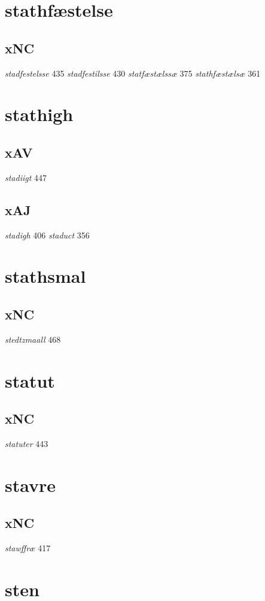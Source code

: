 \documentclass[a4paper,twocolumn]{article}
\begin{document}
\section{stathfæstelse}
\label{sec:orgd05e169}
\subsection{xNC}
\label{sec:org72c4fce}
\emph{stadfestelsse} 435 \emph{stadfestilsse} 430 \emph{statfæstælssæ} 375 \emph{stathfæstælsæ} 361 
\section{stathigh}
\label{sec:orgab9f4d7}
\subsection{xAV}
\label{sec:orga2b2b73}
\emph{stadiigt} 447 
\subsection{xAJ}
\label{sec:org99fe73a}
\emph{stadigh} 406 \emph{staduct} 356 
\section{stathsmal}
\label{sec:org0ba8d79}
\subsection{xNC}
\label{sec:org2743e92}
\emph{stedtzmaall} 468 
\section{statut}
\label{sec:orgaf5fae2}
\subsection{xNC}
\label{sec:orgfd6252c}
\emph{statuter} 443 
\section{stavre}
\label{sec:org4ef68c2}
\subsection{xNC}
\label{sec:org4c48b30}
\emph{stawffræ} 417 
\section{sten}
\label{sec:org8889bf9}
\end{document}
